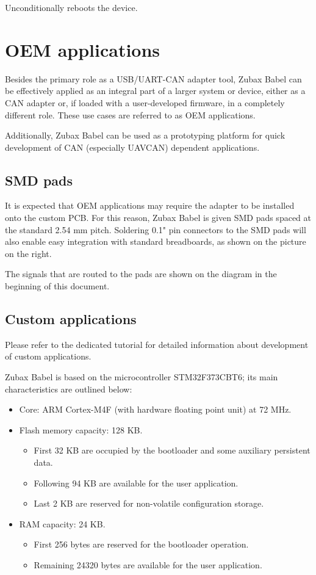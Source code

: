 \documentclass{zubaxdoc}
\begin{document}
Unconditionally reboots the device.

\chapter{OEM applications}\label{sec:oem_applications}

Besides the primary role as a USB/UART-CAN adapter tool, Zubax Babel can be effectively applied as an integral part of a larger system or device, either as a CAN adapter or, if loaded with a user-developed firmware, in a completely different role. These use cases are referred to as OEM applications.

Additionally, Zubax Babel can be used as a prototyping platform for quick development of CAN (especially UAVCAN) dependent applications.

\section{SMD pads}

It is expected that OEM applications may require the adapter to be installed onto the custom PCB. For this reason, Zubax Babel is given SMD pads spaced at the standard 2.54 mm pitch. Soldering 0.1" pin connectors to the SMD pads will also enable easy integration with standard breadboards, as shown on the picture on the right.

The signals that are routed to the pads are shown on the diagram in the beginning of this document.

\section{Custom applications}

Please refer to the dedicated tutorial for detailed information about development of custom applications.

Zubax Babel is based on the microcontroller STM32F373CBT6; its main characteristics are outlined below:

\begin{itemize}
\item Core: ARM Cortex-M4F (with hardware floating point unit) at 72 MHz.
\item Flash memory capacity: 128 KB.
\begin{itemize}
\item First 32 KB are occupied by the bootloader and some auxiliary persistent data.
\item Following 94 KB are available for the user application.
\item Last 2 KB are reserved for non-volatile configuration storage.
\end{itemize}
\item RAM capacity: 24 KB.
\begin{itemize}
\item First 256 bytes are reserved for the bootloader operation.
\item Remaining 24320 bytes are available for the user application.
\end{itemize}
\end{itemize}
\end{document}
